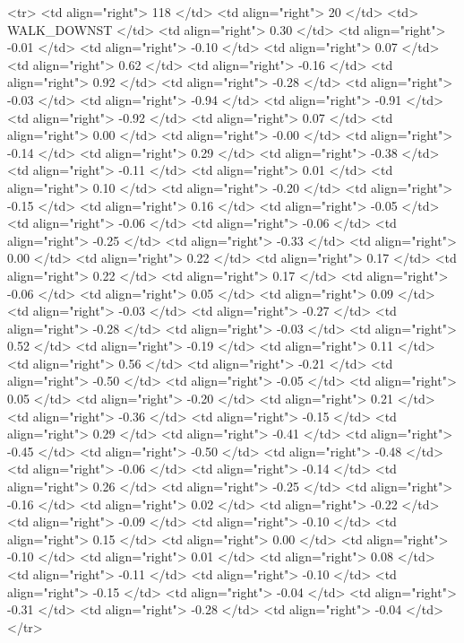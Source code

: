   <tr> <td align="right"> 118 </td> <td align="right">  20 </td> <td> WALK_DOWNST </td> <td align="right"> 0.30 </td> <td align="right"> -0.01 </td> <td align="right"> -0.10 </td> <td align="right"> 0.07 </td> <td align="right"> 0.62 </td> <td align="right"> -0.16 </td> <td align="right"> 0.92 </td> <td align="right"> -0.28 </td> <td align="right"> -0.03 </td> <td align="right"> -0.94 </td> <td align="right"> -0.91 </td> <td align="right"> -0.92 </td> <td align="right"> 0.07 </td> <td align="right"> 0.00 </td> <td align="right"> -0.00 </td> <td align="right"> -0.14 </td> <td align="right"> 0.29 </td> <td align="right"> -0.38 </td> <td align="right"> -0.11 </td> <td align="right"> 0.01 </td> <td align="right"> 0.10 </td> <td align="right"> -0.20 </td> <td align="right"> -0.15 </td> <td align="right"> 0.16 </td> <td align="right"> -0.05 </td> <td align="right"> -0.06 </td> <td align="right"> -0.06 </td> <td align="right"> -0.25 </td> <td align="right"> -0.33 </td> <td align="right"> 0.00 </td> <td align="right"> 0.22 </td> <td align="right"> 0.17 </td> <td align="right"> 0.22 </td> <td align="right"> 0.17 </td> <td align="right"> -0.06 </td> <td align="right"> 0.05 </td> <td align="right"> 0.09 </td> <td align="right"> -0.03 </td> <td align="right"> -0.27 </td> <td align="right"> -0.28 </td> <td align="right"> -0.03 </td> <td align="right"> 0.52 </td> <td align="right"> -0.19 </td> <td align="right"> 0.11 </td> <td align="right"> 0.56 </td> <td align="right"> -0.21 </td> <td align="right"> -0.50 </td> <td align="right"> -0.05 </td> <td align="right"> 0.05 </td> <td align="right"> -0.20 </td> <td align="right"> 0.21 </td> <td align="right"> -0.36 </td> <td align="right"> -0.15 </td> <td align="right"> 0.29 </td> <td align="right"> -0.41 </td> <td align="right"> -0.45 </td> <td align="right"> -0.50 </td> <td align="right"> -0.48 </td> <td align="right"> -0.06 </td> <td align="right"> -0.14 </td> <td align="right"> 0.26 </td> <td align="right"> -0.25 </td> <td align="right"> -0.16 </td> <td align="right"> 0.02 </td> <td align="right"> -0.22 </td> <td align="right"> -0.09 </td> <td align="right"> -0.10 </td> <td align="right"> 0.15 </td> <td align="right"> 0.00 </td> <td align="right"> -0.10 </td> <td align="right"> 0.01 </td> <td align="right"> 0.08 </td> <td align="right"> -0.11 </td> <td align="right"> -0.10 </td> <td align="right"> -0.15 </td> <td align="right"> -0.04 </td> <td align="right"> -0.31 </td> <td align="right"> -0.28 </td> <td align="right"> -0.04 </td> </tr>
